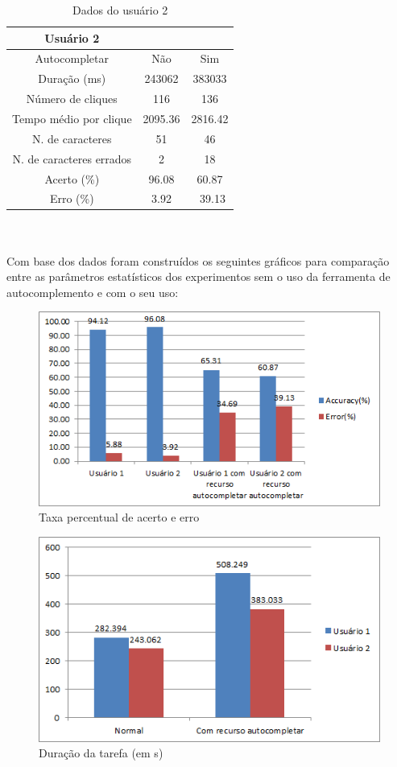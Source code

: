 \documentclass[twoside]{article}
\begin{document}
\begin{multicols}{2}
\begin{table}[H]
\caption{Dados do usuário 2}
\centering
\begin{tabular}{ccc}
\toprule
 Usuário 2 &  & \\
\midrule
Autocompletar & Não & Sim\\
Duração (ms) & 243062 & 383033\\
Número de cliques & 116 & 136\\
Tempo médio por clique & 2095.36 & 2816.42\\
N. de caracteres & 51 & 46\\
N. de caracteres errados & 2 & 18\\
Acerto (\%) & 96.08 & 60.87\\
Erro (\%) & 3.92 &\ 39.13\\
\bottomrule
\end{tabular}
\end{table}
\\\\
Com base dos dados foram construídos os seguintes gráficos para comparação entre as parâmetros estatísticos dos experimentos sem o uso da ferramenta de autocomplemento e com o seu uso:

\begin{figure}[H]
\label{fig:graph_tx}
  \caption{Taxa percentual de acerto e erro}
  \centering
    \includegraphics[scale = 0.50]{graph_acertoerro.png}
\end{figure}

\begin{figure}[H]
\label{fig:graph_d}
  \caption{Duração da tarefa (em s)}
  \centering
    \includegraphics[scale = 0.50]{graph_duracao.png}
\end{figure}


\end{multicols}
\end{document}
